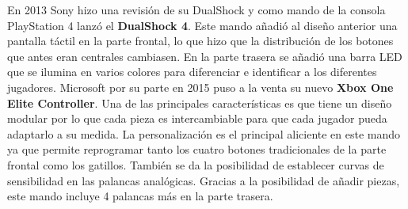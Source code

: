 En 2013 Sony hizo una revisi\'on de su DualShock y como mando de la consola PlayStation 4 lanz\'o el \textbf{DualShock 4}. Este mando a\~nadi\'o al dise\~no anterior una pantalla t\'actil en la parte frontal, lo que hizo que la distribuci\'on de los botones que antes eran centrales cambiasen. En la parte trasera se a\~nadi\'o una barra LED que se ilumina en varios colores para diferenciar e identificar a los diferentes jugadores. Microsoft por su parte en 2015 puso a la venta su nuevo \textbf{Xbox One Elite Controller}. Una de las principales caracter\'isticas es que tiene un dise\~no modular por lo que cada pieza es intercambiable para que cada jugador pueda adaptarlo a su medida. La personalizaci\'on es el principal aliciente en este mando ya que permite reprogramar tanto los cuatro botones tradicionales de la parte frontal como los gatillos. Tambi\'en se da la posibilidad de establecer curvas de sensibilidad en las palancas anal\'ogicas. Gracias a la posibilidad de a\~nadir piezas, este mando incluye 4 palancas m\'as en la parte trasera.\\

